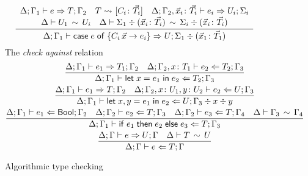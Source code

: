 \begin{figure}[h!]
\begin{gather*}
  \frac{
    \begin{array}{c}
    \algtypeout[\kindEnv;\varEnv_1]{e}{T}{\varEnv_2}
    \quad
    T \Extract{}[C_i\colon\vec T_i]
    \quad
    \algtypeout[\kindEnv;\varEnv_2, \vec x_i\colon\vec T_i]{e_i}{U_i}{\Sigma_i}
    \\
    \typeequiv{U_1}{U_i}    
    \quad
    \ctxequiv{\Sigma_1 \div (\vec x_i\colon\vec T_i)}{\Sigma_i \div (\vec x_i\colon\vec T_i)} 
    \end{array}
  }{
    \algtypeout[\kindEnv;\varEnv_1]{\casee{e}{\{C_i\,\vec x\rightarrow e_i\}}}{U}{\Sigma_1 \div (\vec x_1\colon\vec T_1)}
  }
  \end{gather*}
  The \emph{check against} relation\hfill{}
  \begin{gather*}
    \frac{
      \algtypeout[\kindEnv;\varEnv_1]{e_1}{T_1}{\varEnv_2}
      \quad
      \algtypein[\kindEnv;\varEnv_2,x\colon T_1]{e_2}{T_2}{\Gamma_3}
    }{
      \algtypein[\kindEnv;\varEnv_1]{\unlete{x}{e_1}{e_2}}{T_2}{\varEnv_3}
    }
    \\
    \frac{
      \algtypeout[\kindEnv ; \varEnv_1]{e_1}{T}{\varEnv_2}
      \quad
      \algtypein[\kindEnv; \varEnv_2, x\colon U_1, y\colon U_2]{e_2}{U}{\varEnv_3}
    }{
      \algtypein[\kindEnv;
      \varEnv_1]{\binlete{x}{y}{e_1}{e_2}}{U}{\varEnv_3} \div x \div y
    }
    \\
    \frac{
      \algtypein[\kindEnv;\varEnv_1]{e_1}{\boole}{\varEnv_2}
      \quad
      \algtypein[\kindEnv;\varEnv_2]{e_2}{T}{\varEnv_3}
      \quad
      \algtypein[\kindEnv;\varEnv_2]{e_3}{T}{\varEnv_4}
      \quad
      \ctxequiv{\varEnv_3}{\varEnv_4}
    }{
      \algtypein[\kindEnv;\varEnv_1]{\conditionale{e_1}{e_2}{e_3}}{T}{\varEnv_3}
    }
    \\
        \frac{
      \algtypeout e U \varEnv
      \quad
      \typeequiv T U
    }{
      \algtypein e T \varEnv
    }
  \end{gather*}
  \caption{Algorithmic type checking}
  \label{fig:alg-typing}
\end{figure}

